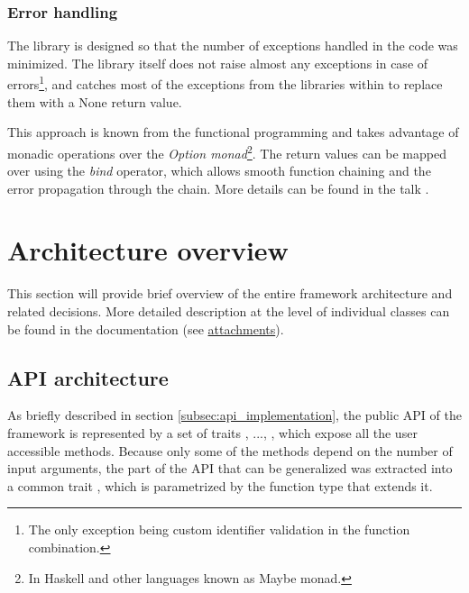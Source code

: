 \subsubsection{Error handling}

The library is designed so that the number of exceptions handled in the code was minimized. The library itself does not raise almost any exceptions in case of errors\footnote{The only exception being custom identifier validation in the function combination.}, and catches most of the exceptions from the libraries within to replace them with a None return value.

This approach is known from the functional programming and takes advantage of monadic operations over the \textit{Option monad}\footnote{In Haskell and other languages known as Maybe monad.}. The return values can be mapped over using the \textit{bind} operator, which allows smooth function chaining and the error propagation through the chain. More details can be found in the talk \cite{noauthor_railway_nodate}.

\section{Architecture overview}
\label{sec:architecture_overview}

This section will provide brief overview of the entire framework architecture and related decisions. More detailed description at the level of individual classes can be found in the documentation (see \hyperref[attachments]{attachments}).

\subsection{API architecture}
\label{subsec:api_architecture}

As briefly described in section \ref{subsec:api_implementation}, the public API of the framework is represented by a set of traits , ..., , which expose all the user accessible methods. Because only some of the methods depend on the number of input arguments, the part of the API that can be generalized was extracted into a common trait , which is parametrized by the function type that extends it. 

